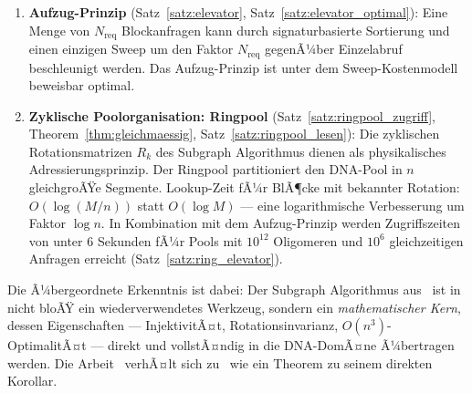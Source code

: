 ﻿\documentclass[a4paper,12pt]{article}
\theoremstyle{definition}
\theoremstyle{plain}
\begin{document}
\begin{enumerate}
  \item \textbf{Aufzug-Prinzip} (Satz~\ref{satz:elevator},
        Satz~\ref{satz:elevator_optimal}): Eine Menge von $N_{\mathrm{req}}$
        Blockanfragen kann durch signaturbasierte Sortierung und einen
        einzigen Sweep um den Faktor $N_{\mathrm{req}}$ gegenÃ¼ber
        Einzelabruf beschleunigt werden.  Das Aufzug-Prinzip ist unter
        dem Sweep-Kostenmodell beweisbar optimal.

  \item \textbf{Zyklische Poolorganisation: Ringpool}
        (Satz~\ref{satz:ringpool_zugriff}, Theorem~\ref{thm:gleichmaessig},
        Satz~\ref{satz:ringpool_lesen}): Die zyklischen Rotationsmatrizen
        $R_k$ des Subgraph Algorithmus dienen als physikalisches
        Adressierungsprinzip.  Der Ringpool partitioniert den DNA-Pool
        in $n$ gleichgroÃŸe Segmente.  Lookup-Zeit fÃ¼r BlÃ¶cke mit bekannter
        Rotation: $O(\log(M/n))$ statt $O(\log M)$ --- eine logarithmische
        Verbesserung um Faktor $\log n$.  In Kombination mit dem
        Aufzug-Prinzip werden Zugriffszeiten von unter $6$ Sekunden fÃ¼r
        Pools mit $10^{12}$ Oligomeren und $10^6$ gleichzeitigen Anfragen
        erreicht (Satz~\ref{satz:ring_elevator}).
\end{enumerate}

Die Ã¼bergeordnete Erkenntnis ist dabei: Der Subgraph Algorithmus aus~\cite{dusgraph}
ist in~\cite{dnastor} nicht bloÃŸ ein wiederverwendetes Werkzeug, sondern
ein \emph{mathematischer Kern}, dessen Eigenschaften --- InjektivitÃ¤t,
Rotationsinvarianz, $O(n^3)$-OptimalitÃ¤t --- direkt und vollstÃ¤ndig in
die DNA-DomÃ¤ne Ã¼bertragen werden.  Die Arbeit~\cite{dusgraph} verhÃ¤lt sich
zu~\cite{dnastor} wie ein Theorem zu seinem direkten Korollar.
\end{document}
